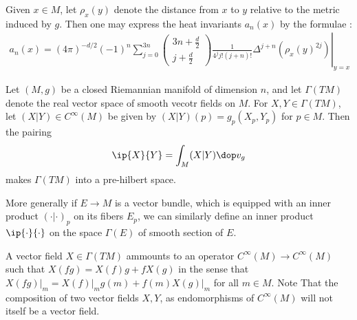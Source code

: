 Given $x\in M$, let $\rho_x(y)$ denote the distance from $x$ to $y$ relative to the metric induced by $g$.  Then one may express the heat invariants $a_n(x)$ by the formulae \cite[Theorem 1.2.1]{polterovichHeatInvariantsRiemannian2000}:
\begin{align}
    a_n(x) = \left.(4 \pi)^{-d / 2}(-1)^n \sum_{j=0}^{3 n}\left(\begin{array}{c}
                                                                        3 n+\frac{d}{2} \\
                                                                        j+\frac{d}{2}
                                                                    \end{array}\right) \frac{1}{4^j j !(j+n) !} \Delta^{j+n}\left(\rho_x(y)^{2 j}\right)\right|_{y=x}
\end{align}


\newpage

Let $(M,g)$ be a closed Riemannian manifold of dimension $n$, and let $\Gamma(TM)$ denote the real vector space of smooth vecotr fields on $M$. For $X,Y \in \Gamma(TM)$, let $(X|Y) \in C^\infty(M)$ be given by $(X|Y)(p) = g_p(X_p,Y_p)$ for $p \in M$. Then the pairing
\begin{align*}
    \ip{X}{Y} = \int_M (X|Y) \dop v_g
\end{align*}
makes $\Gamma(TM)$ into a pre-hilbert space.

More generally if $E \to M$ is a vector bundle, which is equipped with an inner product $(\cdot | \cdot)_p$ on its fibers $E_p$, we can similarly define an inner product $\ip{\cdot}{\cdot}$ on the space $\Gamma(E)$ of smooth section of $E$.

\newpage
A vector field $X \in \Gamma(TM)$ ammounts to an operator $C^\infty(M) \to C^\infty(M)$ such that $X(fg)= X(f)g+fX(g)$ in the sense that $X(fg)\vert_m = X(f)\vert_m g(m) + f(m) X(g)\vert_m$ for all $m \in M$. Note That the composition of two vector fields $X,Y$, as endomorphisms of $C^\infty(M)$ will not itself be a vector field.